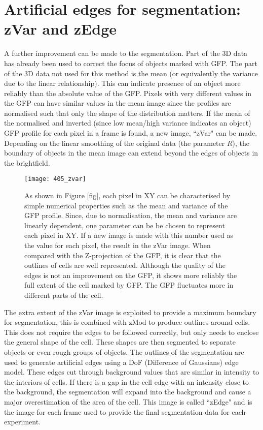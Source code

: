 \section{Artificial edges for segmentation: zVar and zEdge}

A further improvement can be made to the segmentation. Part of the 3D data has already been used to correct the focus of objects marked with GFP. The part of the 3D data not used for this method is the mean (or equivalently the variance due to the linear relationship). This can indicate presence of an object more reliably than the absolute value of the GFP. Pixels with very different values in the GFP can have similar values in the mean image since the profiles are normalised such that only the shape of the distribution matters. If the mean of the normalised and inverted (since low mean/high variance indicates an object) GFP profile for each pixel in a frame is found, a new image, ``zVar" can be made. Depending on the linear smoothing of the original data (the parameter $R$), the boundary of objects in the mean image can extend beyond the edges of objects in the brightfield.

\begin{figure}[h!]
 \centering
 \texttt{[image: 405\_zvar]}
 \caption[zVar example]{
 	As shown in Figure [fig], each pixel in XY can be characterised by simple numerical properties such as the mean and variance of the GFP profile. Since, due to normalisation, the mean and variance are linearly dependent, one parameter can be be chosen to represent each pixel in XY. If a new image is made with this number used as the value for each pixel, the result in the zVar image. When compared with the Z-projection of the GFP, it is clear that the outlines of cells are well represented. Although the quality of the edges is not an improvement on the GFP, it shows more reliably the full extent of the cell marked by GFP. The GFP fluctuates more in different parts of the cell.
 }
 \label{fig:zvar}
\end{figure}

The extra extent of the zVar image is exploited to provide a maximum boundary for segmentation, this is combined with zMod to produce outlines around cells. This does not require the edges to be followed correctly, but only needs to enclose the general shape of the cell. These shapes are then segmented to separate objects or even rough groups of objects. The outlines of the segmentation are used to generate artificial edges using a DoF (Difference of Gaussians) edge model. These edges cut through background values that are similar in intensity to the interiors of cells. If there is a gap in the cell edge with an intensity close to the background, the segmentation will expand into the background and cause a major overestimation of the area of the cell. This image is called ``zEdge" and is the image for each frame used to provide the final segmentation data for each experiment.

